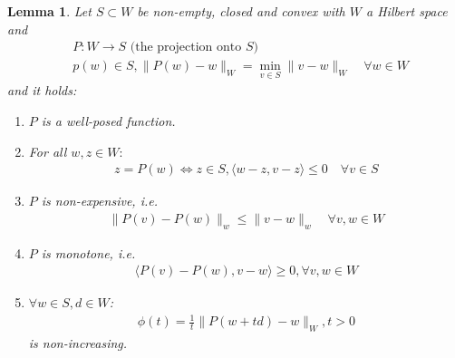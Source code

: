 \documentclass[a4paper,11pt,fleqn]{book}
\newtheorem{lemma}[theorem]{Lemma}
\theoremstyle{definition}
\theoremstyle{remark}
\begin{document}
\begin{lemma}
	Let $S \subset W$ be non-empty, closed and convex with $W$ a Hilbert space and 
	\begin{align*}
		&P: W \rightarrow S \text{ (the projection onto $S$) }\\
		&p(w) \in S, \|P(w) - w \|_W = \min_{v \in S} \|v - w\|_W \quad \forall w \in W
	\end{align*}
	and it holds:
	\begin{enumerate}
		\item $P$ is a well-posed function.
		\item For all $w, z \in W:$
			\begin{align*}
				z = P(w) \Leftrightarrow z \in S, \langle w - z, v - z \rangle \le 0 \quad \forall v \in S
			\end{align*}
		\item $P$ is non-expensive, i.e.
			\begin{align*}
				\|P(v) - P(w)\|_w \le \|v - w\|_w \quad \forall v, w \in W
			\end{align*}
		\item $P$ is monotone, i.e.
			\begin{align*}
				\langle P(v) - P(w), v - w \rangle \ge 0 , \forall v, w \in W
			\end{align*}
		\item $\forall w \in S, d \in W$:
			\begin{align*}
				\phi(t) = \frac{1}{t}\|P(w + td) - w\|_W, t > 0
			\end{align*}
			is non-increasing. 
	\end{enumerate}
\end{lemma}
\end{document}

